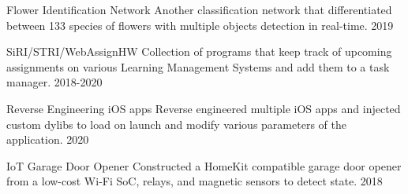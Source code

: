 \begin{cvhonors}

    \cvhonor
      {Flower Identification Network} %
      {Another classification network that differentiated between 133 species of flowers with multiple objects detection in real-time.} %
      {} %
      {2019} %
  
    \cvhonor
      {SiRI/STRI/WebAssignHW} %
      {Collection of programs that keep track of upcoming assignments on various Learning Management Systems and add them to a task manager.} %
      {} %
      {2018-2020} %
  
    \cvhonor
      {Reverse Engineering iOS apps} %
      {Reverse engineered multiple iOS apps and injected custom dylibs to load on launch and modify various parameters of the application.} %
      {} %
      {2020} %
  
    \cvhonor
      {IoT Garage Door Opener} %
      {Constructed a HomeKit compatible garage door opener from a low-cost Wi-Fi SoC, relays, and magnetic sensors to detect state.} %
      {} %
      {2018} %
  
  \end{cvhonors}